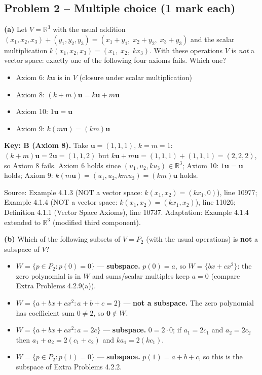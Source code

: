 \documentclass[11pt,a4paper]{article}
\newcommand{\Src}[1]{{\footnotesize\color{black!65}Source: #1}}
\begin{document}
\subsection*{Problem 2 -- Multiple choice (1 mark each)}
\textbf{(a)} Let $V=\mathbb{R}^3$ with the usual addition $(x_1,x_2,x_3)+(y_1,y_2,y_3)=(x_1+y_1,\;x_2+y_2,\;x_3+y_3)$ and the scalar multiplication $k(x_1,x_2,x_3)=(x_1,\;x_2,\;kx_3)$. With these operations $V$ is \emph{not} a vector space: exactly one of the following four axioms fails. Which one?\par
\begin{itemize}[leftmargin=8mm,itemsep=0pt]\item[A] Axiom 6: $k\mathbf{u}$ is in $V$ (closure under scalar multiplication)\item[B$^{\ast}$] Axiom 8: $(k+m)\mathbf{u}=k\mathbf{u}+m\mathbf{u}$\item[C] Axiom 10: $1\mathbf{u}=\mathbf{u}$\item[D] Axiom 9: $k(m\mathbf{u})=(km)\mathbf{u}$\end{itemize}
\textbf{Key: B (Axiom 8).} Take $\mathbf{u}=(1,1,1)$, $k=m=1$: $(k+m)\mathbf{u}=2\mathbf{u}=(1,1,2)$ but $k\mathbf{u}+m\mathbf{u}=(1,1,1)+(1,1,1)=(2,2,2)$, so Axiom 8 fails. Axiom 6 holds since $(u_1,u_2,ku_3)\in\mathbb{R}^3$; Axiom 10: $1\mathbf{u}=\mathbf{u}$ holds; Axiom 9: $k(m\mathbf{u})=(u_1,u_2,kmu_3)=(km)\mathbf{u}$ holds.\par
\Src{Example 4.1.3 (NOT a vector space: $k(x_1,x_2)=(kx_1,0)$), line 10977; Example 4.1.4 (NOT a vector space: $k(x_1,x_2)=(kx_1,x_2)$), line 11026; Definition 4.1.1 (Vector Space Axioms), line 10737. Adaptation: Example 4.1.4 extended to $\mathbb{R}^3$ (modified third component).}\par
\textbf{(b)} Which of the following subsets of $V=P_2$ (with the usual operations) is \textbf{not} a subspace of $V$?\par
\begin{itemize}[leftmargin=8mm,itemsep=0pt]\item[A] $W=\{p\in P_2 : p(0)=0\}$ --- \textbf{subspace.} $p(0)=a$, so $W=\{bx+cx^2\}$: the zero polynomial is in $W$ and sums/scalar multiples keep $a=0$ (compare Extra Problems 4.2.9(a)).\item[B$^{\ast}$] $W=\{a+bx+cx^2 : a+b+c=2\}$ --- \textbf{not a subspace.} The zero polynomial has coefficient sum $0\neq2$, so $\mathbf{0}\notin W$.\item[C] $W=\{a+bx+cx^2 : a=2c\}$ --- \textbf{subspace.} $0=2\cdot0$; if $a_1=2c_1$ and $a_2=2c_2$ then $a_1+a_2=2(c_1+c_2)$ and $ka_1=2(kc_1)$.\item[D] $W=\{p\in P_2 : p(1)=0\}$ --- \textbf{subspace.} $p(1)=a+b+c$, so this is the subspace of Extra Problems 4.2.2.\end{itemize}
\end{document}

